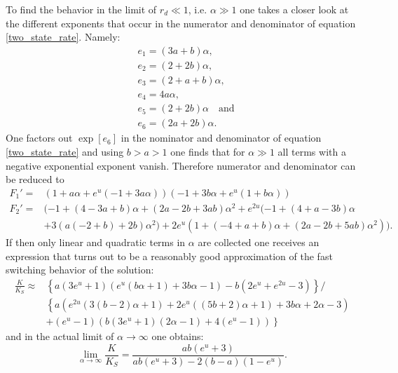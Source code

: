 To find the behavior in the limit of $r_d \ll 1 $, i.e. $\alpha \gg 1$ one takes a closer look at the different exponents that occur in the numerator and denominator of equation \eqref{two_state_rate}. Namely:
\begin{align}
& e_1 = (3a+b)\alpha, \nonumber \\
& e_2 = (2+2b)\alpha, \nonumber \\
& e_3 = (2+a+b)\alpha, \nonumber \\
& e_4 = 4a\alpha, \nonumber \\
& e_5 = (2+2b)\alpha \quad \textrm{and} \nonumber \\
& e_6 = (2a+2b)\alpha.
\end{align}
One factors out $\exp[e_6]$ in the nominator and denominator of equation \eqref{two_state_rate} and using $b > a > 1$ one finds that for $\alpha \gg 1$ all terms with a negative exponential exponent vanish. Therefore numerator and denominator can be reduced to
\begin{align*}
    F_1' =& ( 1 + a \alpha + e^u (-1 + 3 a \alpha)) (-1 + 3 b \alpha + e^u (1 + b \alpha))\\
    F_2' =& (-1 + (4 - 3 a + b) \alpha + (2 a - 2 b + 3 a b) \alpha^2 + e^{2 u} (-1 + (4 + a - 3 b) \alpha \\
          &+ 3 (a (-2 + b) + 2 b) \alpha^2) + 2 e^u (1 + (-4 + a + b) \alpha + (2 a - 2 b + 5 a b) \alpha^2)).
\end{align*}
If then only linear and quadratic terms in $\alpha$ are collected one receives an expression that turns out to be a reasonably good approximation of the fast switching behavior of the solution: 
\begin{align}
    \frac{K}{K_{S}} \approx &\left\{a \left(3 e^u+1\right) \left(e^u (b \alpha+1)+3 b \alpha-1\right)-b \left(2 e^u+e^{2 u}-3\right)\right\} / \nonumber \\
                          &\left\{a \left(e^{2 u} (3 (b-2) \alpha+1)+2 e^u ((5 b+2) \alpha+1)+3 b \alpha+2 \alpha-3\right) \right.  \nonumber \\
                          & \left. +\left(e^u-1\right) \left(b \left(3 e^u+1\right) (2 \alpha-1)+4 \left(e^u-1\right)\right) \right\}
    \label{kla}
\end{align}
and in the actual limit of $\alpha \rightarrow \infty$ one obtains: 
\begin{equation}
    \lim_{\alpha \rightarrow \infty} \frac{K}{K_{S}} = \frac{a b \left(e^u+3\right)}{ab \left(e^u+3\right)-2(b-a)(1-e^u)}.
    \label{kliminfa}
\end{equation}
